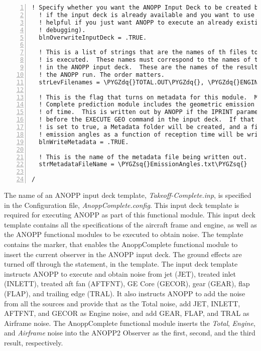 \documentclass[letterpaper,10pt,english]{sphinxmanual}
\def\PYGZsq{\char`\'}
\def\PYGZdq{\char`\"}
\renewcommand\PYGZsq{\textquotesingle}
\begin{document}
\begin{Verbatim}[commandchars=\\\{\},numbers=left,firstnumber=1,stepnumber=1]
  ! Specify whether you want the ANOPP Input Deck to be created by ANOPP2 (.TRUE.) or
  ! if the input deck is already available and you want to use it (.FALSE.). This is 
  ! helpful if you just want ANOPP to execute an already existing deck (useful for 
  ! debugging).
  blnOverwriteInputDeck = .TRUE.

  ! This is a list of strings that are the names of th files to be parse after ANOPP
  ! is executed.  These names must correspond to the names of the LEVOUT parameter 
  ! in the ANOPP input deck.  These are the names of the results to be taken out of 
  ! the ANOPP run. The order matters.
  strLevFilenames = \PYGZdq{}TOTAL.OUT\PYGZdq{}, \PYGZdq{}ENGINE.OUT\PYGZdq{}, \PYGZdq{}AIRFRAME.OUT\PYGZdq{}

  ! This is the flag that turns on metadata for this module.  Metadata for the ANOPP
  ! Complete prediction module includes the geometric emission angles as a function 
  ! of time.  This is written out by ANOPP if the IPRINT parameter is set to 3 right
  ! before the EXECUTE GEO command in the input deck.  If that is set and this flag
  ! is set to true, a Metadata folder will be created, and a file containing the 
  ! emission angles as a function of reception time will be written out.
  blnWriteMetadata = .TRUE.

  ! This is the name of the metadata file being written out.
  strMetadataFileName = \PYGZsq{}EmissionAngles.txt\PYGZsq{}

/
\end{Verbatim}

The name of an ANOPP input deck template, \emph{Takeoff-Complete.inp}, is specified in the Configuration file, \emph{AnoppComplete.config}.
This input deck template is required for executing ANOPP as part of this functional module.
This input deck template contains all the specifications of the aircraft frame and engine, as well as the ANOPP functional modules to be executed to obtain noise.
The template contains the marker,  that enables the AnoppComplete functional module to insert the current observer in the ANOPP input deck.
The ground effects are turned off through the statement,  in the template.
The input deck template instructs ANOPP to execute and obtain noise from jet (JET), treated inlet (INLETT), treated aft fan (AFTFNT), GE Core (GECOR), gear (GEAR), flap (FLAP), and trailing edge (TRAL).
It also instructs ANOPP to add the noise from all the sources and provide that as the Total noise, add JET, INLETT, AFTFNT, and GECOR as Engine noise, and add GEAR, FLAP, and TRAL as Airframe noise. The AnoppComplete functional module inserts the \emph{Total}, \emph{Engine}, and \emph{Airframe} noise into the ANOPP2 Observer as the first, second, and the third result, respectively.
\end{document}
